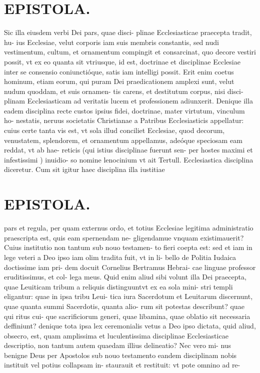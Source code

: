 \documentclass{article}
\begin{document}
\begin{pages}
\section*{EPISTOLA. }\pstart Sic illa eiusdem verbi Dei pars, quae disci- plinae Ecclesiasticae praecepta tradit, hu- ius Ecclesiae, velut corporis iam suis membris constantis, sed nudi vestimentum, cultum, et ornamentum compingit et consarcinat, quo decore vestiri possit, vt ex eo quanta sit vtriusque, id est, doctrinae et disciplinae Ecclesiae inter se consensio coniunctióque, satis iam intelligi possit. Erit enim coetus hominum, etiam eorum, qui puram Dei praedicationem amplexi sunt, velut nudum quoddam, et suis ornamen- tis carens, et destitutum corpus, nisi disci- plinam Ecclesiasticam ad veritatis lucem et professionem adiunxerit. Denique illa eadem disciplina recte custos ipsius fidei, doctrinae, mater virtutum, vinculum ho- nestatis, neruus societatis Christianae a Patribus Ecclesiasticis appellatur: cuius certe tanta vis est, vt sola illud conciliet Ecclesiae, quod decorum, venustatem, splendorem, et ornamentum appellamus, adeóque speciosam eam reddat, vt ab hae- reticis (qui istius disciplinae fuerunt sen- per hostes maximi et infestissimi ) inuidio- so nomine lenocinium vt ait Tertull. Ecclesiastica disciplina diceretur. Cum sit igitur haec disciplina illa iustitiae  \pend
\section*{EPISTOLA. }\pstart pars et regula, per quam externus ordo, et totius Ecclesiae legitima administratio praescripta est, quis eam spernendam ne- gligendamue vnquam existimauerit? Cuius institutio non tantum sub nouo testamen- to fieri coepta est: sed et iam in lege veteri a Deo ipso iam olim tradita fuit, vt in li- bello de Politia Iudaica doctissime iam pri- dem docuit Cornelius Bertramus Hebrai- cae linguae professor eruditissimus, et col- lega meus. Quid enim aliud sibi volunt illa Dei praecepta, quae Leuiticam tribum a reliquis distinguuntvt ex ea sola mini- stri templi eligantur: quae in ipsa tribu Leui- tica iura Sacerdotum et Leuitarum discernunt, quae quanta summi Sacerdotis, quanta alio- rum sit potestas describunt? quae qui ritus cui- que sacrificiorum generi, quae libamina, quae oblatio sit necessaria deffiniunt? denique tota ipsa lex ceremonialis vetus a Deo ipso dictata, quid aliud, obsecro, est, quam amplissima et luculentissima disciplinae Ecclesiasticae descriptio, non tantum autem quaedam illius delineatio? Nec vero mi- nus benigne Deus per Apostolos sub nouo testamento eandem disciplinam nobis instituit vel potius collapsam in- staurauit et restituit: vt pote omnino ad re-  \pend

\end{pages}
\end{document}
